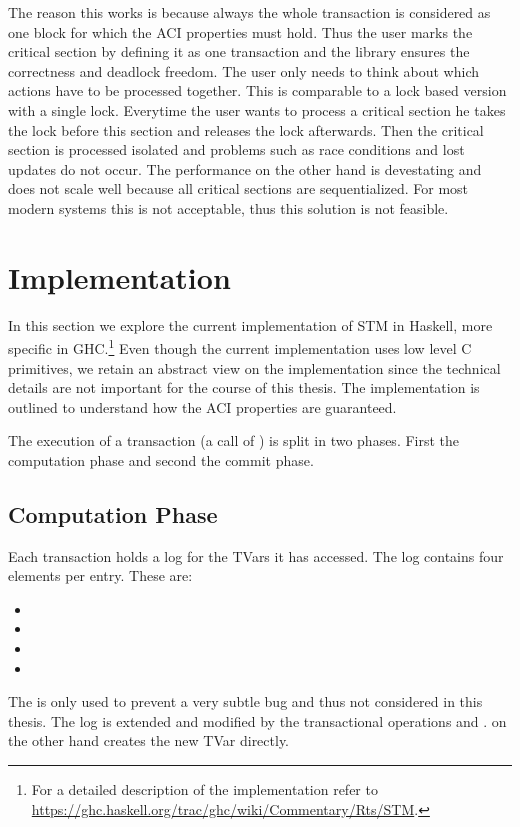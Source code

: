 The reason this works is because always the whole transaction is considered as one block for which
the ACI properties must hold. Thus the user marks the critical section by defining it as one transaction and the 
library ensures the correctness and deadlock freedom. The user only needs to think about which actions have to be 
processed together. This is comparable to a lock based version with a single lock. Everytime the user wants to process a 
critical section he takes the lock before this section and releases the lock afterwards. Then the critical section 
is processed isolated and problems such as race conditions and lost updates do not occur. The performance on the
other hand is devestating and does not scale well because all critical sections are sequentialized. For
most modern systems this is not acceptable, thus this solution is not feasible. 
  
\section{Implementation}
\label{sec:GHCImpl}
In this section we explore the current implementation of STM in Haskell, more specific in GHC.\footnote{For a detailed description of the implementation 
refer to \url{https://ghc.haskell.org/trac/ghc/wiki/Commentary/Rts/STM}.}
Even though the current implementation uses low level C primitives, we retain an abstract view on the implementation since the technical 
details are not important for the course of this thesis. The implementation is outlined to understand how the ACI 
properties are guaranteed.

The execution of a transaction (a call of ) is split in two phases. First the computation phase and second the commit phase. 
 
\subsection{Computation Phase}
Each transaction holds a log for the TVars it has accessed. The log contains four elements per entry. These are: 
\begin{itemize}
 \item {}
 \item {}
 \item {}
 \item {}
\end{itemize}
The  is only used to prevent a very subtle bug and thus not considered in this thesis. 
The log is extended and modified by the transactional operations  and .  on 
the other hand creates the new TVar directly. 

